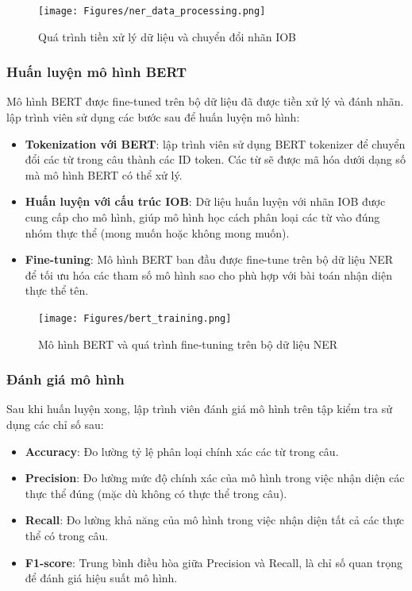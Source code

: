 \begin{figure}[H]
    \centering
    \texttt{[image: Figures/ner\_data\_processing.png]}
    \caption{Quá trình tiền xử lý dữ liệu và chuyển đổi nhãn IOB}
\end{figure}

\subsubsection{Huấn luyện mô hình BERT}
Mô hình BERT được fine-tuned trên bộ dữ liệu đã được tiền xử lý và đánh nhãn. lập trình viên sử dụng các bước sau để huấn luyện mô hình:
\begin{itemize}
    \item \textbf{Tokenization với BERT}: lập trình viên sử dụng BERT tokenizer để chuyển đổi các từ trong câu thành các ID token. Các từ sẽ được mã hóa dưới dạng số mà mô hình BERT có thể xử lý.
    \item \textbf{Huấn luyện với cấu trúc IOB}: Dữ liệu huấn luyện với nhãn IOB được cung cấp cho mô hình, giúp mô hình học cách phân loại các từ vào đúng nhóm thực thể (mong muốn hoặc không mong muốn).
    \item \textbf{Fine-tuning}: Mô hình BERT ban đầu được fine-tune trên bộ dữ liệu NER để tối ưu hóa các tham số mô hình sao cho phù hợp với bài toán nhận diện thực thể tên.
\end{itemize}

\begin{figure}[H]
    \centering
    \texttt{[image: Figures/bert\_training.png]}
    \caption{Mô hình BERT và quá trình fine-tuning trên bộ dữ liệu NER}
\end{figure}

\subsubsection{Đánh giá mô hình}
Sau khi huấn luyện xong, lập trình viên đánh giá mô hình trên tập kiểm tra sử dụng các chỉ số sau:
\begin{itemize}
    \item \textbf{Accuracy}: Đo lường tỷ lệ phân loại chính xác các từ trong câu.
    \item \textbf{Precision}: Đo lường mức độ chính xác của mô hình trong việc nhận diện các thực thể đúng (mặc dù không có thực thể trong câu).
    \item \textbf{Recall}: Đo lường khả năng của mô hình trong việc nhận diện tất cả các thực thể có trong câu.
    \item \textbf{F1-score}: Trung bình điều hòa giữa Precision và Recall, là chỉ số quan trọng để đánh giá hiệu suất mô hình.
\end{itemize}

